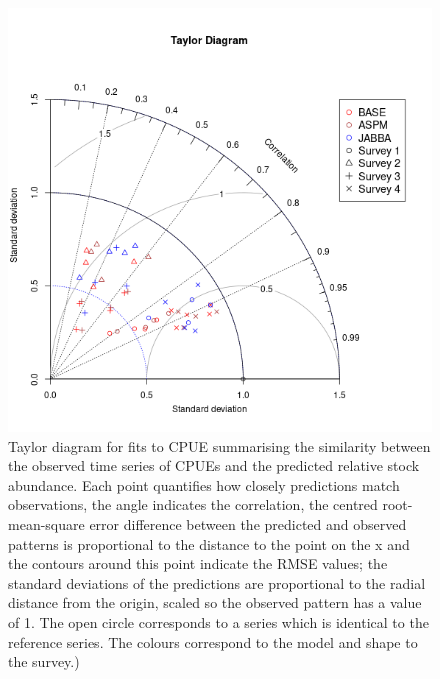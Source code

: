 \documentclass[a4paper]{article}
\begin{document}
\begin{figure}[htbp]
\centering
\includegraphics[width=6in]{final-taylor-residuals-1.png}
\caption{Taylor diagram for fits to CPUE summarising the similarity between the observed time series of CPUEs and the predicted relative stock abundance. Each point quantifies how closely predictions match observations, the angle indicates the correlation, the centred root-mean-square error difference between the predicted and observed patterns is proportional to the distance to the point on the x and the contours around this point indicate the RMSE values; the standard deviations of the predictions are proportional to the radial distance from the origin, scaled so the observed pattern has a value of 1. The open circle corresponds to a series which is identical to the reference series. The colours correspond to the model and shape to the survey.)}
\label{fig:td}
\end{figure}
\end{document}
